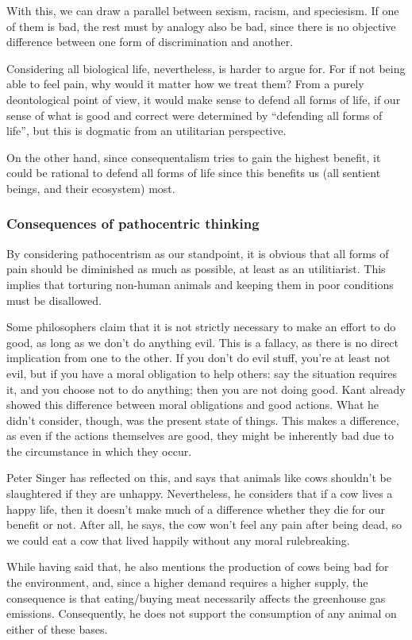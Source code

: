 \documentclass{myassignment}
\newcommand{\q}[1]{``#1''}
\begin{document}
\begin{answer}
		With this, we can draw a parallel between sexism, racism, and speciesism. If one of them is bad, the rest must by analogy also be bad, since there is no objective difference between one form of discrimination and another.

		Considering all biological life, nevertheless, is harder to argue for. For if not being able to feel pain, why would it matter how we treat them? From a purely deontological point of view, it would make sense to defend all forms of life, if our sense of what is good and correct were determined by \q{defending all forms of life}, but this is dogmatic from an utilitarian perspective. 

		On the other hand, since consequentalism tries to gain the highest benefit, it could be rational to defend all forms of life since this benefits us (all sentient beings, and their ecosystem) most.


		\subsubsection*{Consequences of pathocentric thinking}%

		By considering pathocentrism as our standpoint, it is obvious that all forms of pain should be diminished as much as possible, at least as an utilitiarist. This implies that torturing non-human animals and keeping them in poor conditions must be disallowed. 

		Some philosophers claim that it is not strictly necessary to make an effort to do good, as long as we don't do anything evil. This is a fallacy, as there is no direct implication from one to the other. If you don't do evil stuff, you're at least not evil, but if you have a moral obligation to help others: say the situation requires it, and you choose not to do anything; then you are not doing good. Kant already showed this difference between moral obligations and good actions. What he didn't consider, though, was the present state of things. This makes a difference, as even if the actions themselves are good, they might be inherently bad due to the circumstance in which they occur.

		Peter Singer has reflected on this, and says that animals like cows shouldn't be slaughtered if they are unhappy. Nevertheless, he considers that if a cow lives a happy life, then it doesn't make much of a difference whether they die for our benefit or not. After all, he says, the cow won't feel any pain after being dead, so we could eat a cow that lived happily without any moral rulebreaking.

		While having said that, he also mentions the production of cows being bad for the environment, and, since a higher demand requires a higher supply, the consequence is that eating/buying meat necessarily affects the greenhouse gas emissions. Consequently, he does not support the consumption of any animal on either of these bases.
 	\end{answer}
\end{document}
